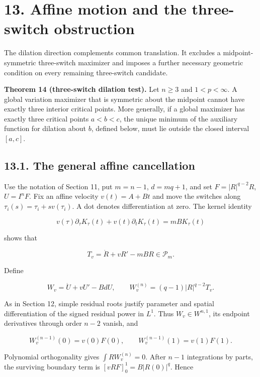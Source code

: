 \documentclass[11pt]{article}
\begin{document}
\section{13. Affine motion and the three-switch
obstruction}\label{affine-motion-and-the-three-switch-obstruction}

The dilation direction complements common translation. It excludes a
midpoint-symmetric three-switch maximizer and imposes a further
necessary geometric condition on every remaining three-switch candidate.

\textbf{Theorem 14 (three-switch dilation test).} Let \(n\ge3\) and
\(1<p<\infty\). A global variation maximizer that is symmetric about the
midpoint cannot have exactly three interior critical points. More
generally, if a global maximizer has exactly three critical points
\(a<b<c\), the unique minimum of the auxiliary function for dilation
about \(b\), defined below, must lie outside the closed interval
\([a,c]\).

\subsection{13.1. The general affine
cancellation}\label{the-general-affine-cancellation}

Use the notation of Section 11, put \(m=n-1\), \(d=mq+1\), and set
\(F=|R|^{q-2}R\), \(U=I^nF\). Fix an affine velocity \(v(t)=A+Bt\) and
move the switches along \(\tau_i(s)=\tau_i+s v(\tau_i)\). A dot denotes
differentiation at zero. The kernel identity

\[
v(\tau)\partial_\tau K_\tau(t)+v(t)\partial_tK_\tau(t)=mB K_\tau(t)
\]

shows that

\[
T_v=\dot R+vR'-mBR\in\mathcal P_m.
\tag{13.1}
\]

Define

\[
W_v=\dot U+vU'-BdU,\qquad
W_v^{(n)}=(q-1)|R|^{q-2}T_v.
\tag{13.2}
\]

As in Section 12, simple residual roots justify parameter and spatial
differentiation of the signed residual power in \(L^1\). Thus
\(W_v\in W^{n,1}\), its endpoint derivatives through order \(n-2\)
vanish, and

\[
W_v^{(n-1)}(0)=v(0)F(0),\qquad
W_v^{(n-1)}(1)=v(1)F(1).
\tag{13.3}
\]

Polynomial orthogonality gives \(\int RW_v^{(n)}=0\). After \(n-1\)
integrations by parts, the surviving boundary term is
\([vRF]_0^1=B|R(0)|^q\). Hence
\end{document}
